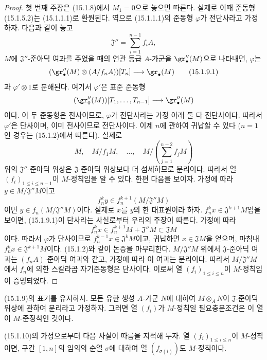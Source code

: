 \begin{proof}
첫 번째 주장은 (15.1.8)에서 $M_1=0$으로 놓으면 따른다. 실제로 이때
준동형 (15.1.5.2)는 (15.1.1.1)로 환원된다. 역으로 (15.1.1.1)의
준동형 $\varphi$가 전단사라고 가정하자. 다음과 같이 놓고
\[
  \mathfrak{J}''=\sum_{i=1}^{n-1}f_iA,
\]
$M$에 $\mathfrak{J}''$-준아딕 여과를 주었을 때의 연관 등급
$A$-가군을 $\gr''_\bullet(M)$으로 나타내면, $\varphi$는
\[
  (\gr''_\bullet(M)\otimes(A/f_nA))[T_n]\longrightarrow\gr_\bullet(M)
  \tag{15.1.9.1}\label{0.15.1.9.1-fr}
\]
과 $\varphi'\otimes1$로 분해된다. 여기서 $\varphi'$은 표준 준동형
\[
  (\gr''_0(M))[T_1,\ldots,T_{n-1}]
  \longrightarrow\gr''_\bullet(M)
\]
이다. 이 두 준동형은 전사이므로, $\varphi$가 전단사라는 가정 아래
둘 다 전단사이다. 따라서 $\varphi'$은 단사이며, 이미 전사이므로
전단사이다. 이제 $n$에 관하여 귀납할 수 있다 ($n=1$인 경우는
(15.1.2)에서 따른다). 실제로
\[
  M,\quad M/f_1M,\quad\ldots,\quad
  M/\left(\sum_{j=1}^{n-2}f_jM\right)
\]
위의 $\mathfrak{J}''$-준아딕 위상은 $\mathfrak{J}$-준아딕 위상보다
더 섬세하므로 분리이다. 따라서 열 $(f_i)_{1\leq i\leq n-1}$이
$M$-정칙임을 알 수 있다. 한편 다음을 보이자.
가정에 따라 $y\in M/\mathfrak{J}''M$이고
\[
  f_n^ky\in f_n^{k+1}(M/\mathfrak{J}''M)
\]
이면 $y\in f_n(M/\mathfrak{J}''M)$이다. 실제로 $x$를 $y$의 한
대표원이라 하자. $f_n^kx\in\mathfrak{J}^{k+1}M$임을 보이면,
(15.1.9.1)이 단사라는 사실로부터 우리의 주장이 따른다. 가정에 따라
\[
  f_n^kx\in f_n^{k+1}M+\mathfrak{J}''M\subset\mathfrak{J}M
\]
이다. 따라서 $\varphi$가 단사이므로
$f_n^{k-1}x\in\mathfrak{J}^kM$이고, 귀납하면
$x\in\mathfrak{J}M$을 얻으며, 마침내
$f_n^kx\in\mathfrak{J}^{k+1}M$이다. (15.1.2)와 같이 논증을
마무리한다. $M/\mathfrak{J}''M$ 위에서 $\mathfrak{J}$-준아딕 여과는
$(f_nA)$-준아딕 여과와 같고, 가정에 따라 이 여과는 분리이다. 따라서
$M/\mathfrak{J}''M$에서 $f_n$에 의한 스칼라곱 자기준동형은 단사이다.
이로써 열 $(f_i)_{1\leq i\leq n}$이 $M$-정칙임이 증명되었다.
\end{proof}

\begin{corollary}[15.1.10]
\label{0.15.1.10-fr}
(15.1.9)의 표기를 유지하자. 모든 유한 생성 $A$-가군 $N$에 대하여
$M\otimes_A N$이 $\mathfrak{J}$-준아딕 위상에 관하여 분리라고
가정하자. 그러면 열 $(f_i)$가 $M$-정칙일 필요충분조건은 이 열이
$M$-준정칙인 것이다.
\end{corollary}

(15.1.10)의 가정으로부터 다음 사실이 따름을 지적해 두자. 열
$(f_i)_{1\leq i\leq n}$이 $M$-정칙이면, 구간 $[1,n]$의 임의의
순열 $\sigma$에 대하여 열 $(f_{\sigma(i)})$도 $M$-정칙이다.


